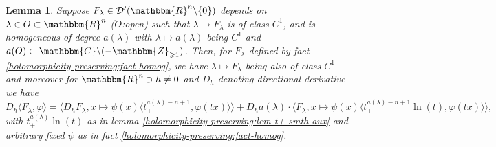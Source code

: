 \documentclass{article}
\newtheorem{lemma}[proposition]{Lemma}
\theoremstyle{remark}
\begin{document}
\begin{lemma}
  \label{holomorphicity-preserving:lem-t+-smth}Suppose $F_{\lambda} \in
  \mathcal{D}' (\mathbbm{R}^n \backslash \{ 0 \})$ depends on $\lambda \in O
  \subset \mathbbm{R}^n$ ($O$:open) such that $\lambda \mapsto F_{\lambda}$ is
  of class $C^1$, and is homogeneous of degree $a (\lambda)$ with $\lambda
  \mapsto a (\lambda)$ being $C^1$ and $a (O) \subset \mathbbm{C}\backslash
  (-\mathbbm{Z}_{\geqslant 1})$. Then, for $\dot{F}_{\lambda}$ defined by fact
  \ref{holomorphicity-preserving:fact-homog}, we have $\lambda \mapsto
  \dot{F}_{\lambda}$ being also of class $C^1$ and moreover for $\mathbbm{R}^n
  \ni h \neq 0$ and $D_h$ denoting directional derivative we have
  \begin{equation}
    \label{holomorphicity-preserving:eq-1} D_h \langle \dot{F}_{\lambda},
    \varphi \rangle = \langle D_h F_{\lambda}, x \mapsto \psi (x) \langle t^{a
    (\lambda) - n + 1}_+, \varphi (t x) \rangle \rangle + D_h a (\lambda)
    \cdot \langle F_{\lambda}, x \mapsto \psi (x) \langle t_+^{a (\lambda) - n
    + 1} \ln (t), \varphi (t x) \rangle \rangle,
  \end{equation}
  with $t_+^{a (\lambda)} \ln (t)$ as in lemma
  \ref{holomorphicity-preserving:lem-t+-smth-aux} and arbitrary fixed $\psi$
  as in fact \ref{holomorphicity-preserving:fact-homog}.
\end{lemma}
\end{document}
